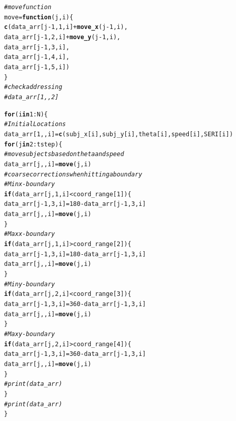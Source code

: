 \documentclass{article}\usepackage[]{graphicx}\usepackage[]{color}
\makeatletter
\newcommand{\hlnum}[1]{\textcolor[rgb]{0.686,0.059,0.569}{#1}}%
\newcommand{\hlcom}[1]{\textcolor[rgb]{0.678,0.584,0.686}{\textit{#1}}}%
\newcommand{\hlopt}[1]{\textcolor[rgb]{0,0,0}{#1}}%
\newcommand{\hlstd}[1]{\textcolor[rgb]{0.345,0.345,0.345}{#1}}%
\newcommand{\hlkwa}[1]{\textcolor[rgb]{0.161,0.373,0.58}{\textbf{#1}}}%
\newcommand{\hlkwb}[1]{\textcolor[rgb]{0.69,0.353,0.396}{#1}}%
\newcommand{\hlkwc}[1]{\textcolor[rgb]{0.333,0.667,0.333}{#1}}%
\newcommand{\hlkwd}[1]{\textcolor[rgb]{0.737,0.353,0.396}{\textbf{#1}}}%
\newenvironment{kframe}{%
 \def\at@end@of@kframe{}%
 \ifinner\ifhmode%
  \def\at@end@of@kframe{\end{minipage}}%
  \begin{minipage}{\columnwidth}%
 \fi\fi%
 \def\FrameCommand##1{\hskip\@totalleftmargin \hskip-\fboxsep
 \colorbox{shadecolor}{##1}\hskip-\fboxsep
     \hskip-\linewidth \hskip-\@totalleftmargin \hskip\columnwidth}%
 \MakeFramed {\advance\hsize-\width
   \@totalleftmargin\z@ \linewidth\hsize
   \@setminipage}}%
 {\par\unskip\endMakeFramed%
 \at@end@of@kframe}
\newenvironment{knitrout}{}{} %
\makeatother
\begin{document}
\begin{knitrout}
\begin{kframe}
\begin{alltt}
\hlcom{# move function}
\hlstd{move} \hlkwb{=} \hlkwa{function}\hlstd{(}\hlkwc{j}\hlstd{,} \hlkwc{i}\hlstd{)\{}
  \hlkwd{c}\hlstd{(data_arr[j}\hlopt{-}\hlnum{1}\hlstd{,} \hlnum{1}\hlstd{, i]}\hlopt{+} \hlkwd{move_x}\hlstd{(j}\hlopt{-}\hlnum{1}\hlstd{,i),}
    \hlstd{data_arr[j}\hlopt{-}\hlnum{1}\hlstd{,} \hlnum{2}\hlstd{, i]}\hlopt{+} \hlkwd{move_y}\hlstd{(j}\hlopt{-}\hlnum{1}\hlstd{,i),}
    \hlstd{data_arr[j}\hlopt{-}\hlnum{1}\hlstd{,} \hlnum{3}\hlstd{, i],}
    \hlstd{data_arr[j}\hlopt{-}\hlnum{1}\hlstd{,} \hlnum{4}\hlstd{, i],}
    \hlstd{data_arr[j}\hlopt{-}\hlnum{1}\hlstd{,} \hlnum{5}\hlstd{, i])}
\hlstd{\}}
\hlcom{# check addressing}
\hlcom{# data_arr[1,, 2]}

\hlkwa{for}\hlstd{(i} \hlkwa{in} \hlnum{1}\hlopt{:}\hlstd{N)\{}
  \hlcom{# Initial Locations}
  \hlstd{data_arr[}\hlnum{1}\hlstd{,,i]} \hlkwb{=} \hlkwd{c}\hlstd{(subj_x[i], subj_y[i], theta[i], speed[i], SERI[i])}
  \hlkwa{for}\hlstd{(j} \hlkwa{in} \hlnum{2}\hlopt{:}\hlstd{tstep)\{}
    \hlcom{# move subjects based on theta and speed}
    \hlstd{data_arr[j,,i]} \hlkwb{=} \hlkwd{move}\hlstd{(j, i)}
    \hlcom{# coarse corrections when hitting a boundary}
    \hlcom{# Min x-boundary}
    \hlkwa{if}\hlstd{(data_arr[j,}\hlnum{1}\hlstd{,i]} \hlopt{<} \hlstd{coord_range[}\hlnum{1}\hlstd{])\{}
      \hlstd{data_arr[j}\hlopt{-}\hlnum{1}\hlstd{,}\hlnum{3}\hlstd{,i]}\hlkwb{=}\hlnum{180}\hlopt{-}\hlstd{data_arr[j}\hlopt{-}\hlnum{1}\hlstd{,}\hlnum{3}\hlstd{,i]}
      \hlstd{data_arr[j,,i]} \hlkwb{=} \hlkwd{move}\hlstd{(j,i)}
    \hlstd{\}}
    \hlcom{#Max x-boundary}
    \hlkwa{if}\hlstd{(data_arr[j,}\hlnum{1}\hlstd{,i]} \hlopt{>} \hlstd{coord_range[}\hlnum{2}\hlstd{])\{}
      \hlstd{data_arr[j}\hlopt{-}\hlnum{1}\hlstd{,}\hlnum{3}\hlstd{,i]}\hlkwb{=}\hlnum{180}\hlopt{-}\hlstd{data_arr[j}\hlopt{-}\hlnum{1}\hlstd{,}\hlnum{3}\hlstd{,i]}
      \hlstd{data_arr[j,,i]} \hlkwb{=} \hlkwd{move}\hlstd{(j,i)}
    \hlstd{\}}
    \hlcom{#Min y-boundary}
    \hlkwa{if}\hlstd{(data_arr[j,}\hlnum{2}\hlstd{,i]} \hlopt{<} \hlstd{coord_range[}\hlnum{3}\hlstd{])\{}
      \hlstd{data_arr[j}\hlopt{-}\hlnum{1}\hlstd{,}\hlnum{3}\hlstd{,i]}\hlkwb{=}\hlnum{360}\hlopt{-}\hlstd{data_arr[j}\hlopt{-}\hlnum{1}\hlstd{,}\hlnum{3}\hlstd{,i]}
      \hlstd{data_arr[j,,i]} \hlkwb{=} \hlkwd{move}\hlstd{(j,i)}
    \hlstd{\}}
    \hlcom{#Max y-boundary}
    \hlkwa{if}\hlstd{(data_arr[j,}\hlnum{2}\hlstd{,i]} \hlopt{>} \hlstd{coord_range[}\hlnum{4}\hlstd{])\{}
      \hlstd{data_arr[j}\hlopt{-}\hlnum{1}\hlstd{,}\hlnum{3}\hlstd{,i]}\hlkwb{=}\hlnum{360}\hlopt{-}\hlstd{data_arr[j}\hlopt{-}\hlnum{1}\hlstd{,}\hlnum{3}\hlstd{,i]}
      \hlstd{data_arr[j,,i]} \hlkwb{=} \hlkwd{move}\hlstd{(j,i)}
    \hlstd{\}}
   \hlcom{# print(data_arr)}
  \hlstd{\}}
  \hlcom{#print(data_arr)}
\hlstd{\}}
\end{alltt}
\end{kframe}
\end{knitrout}
\end{document}
